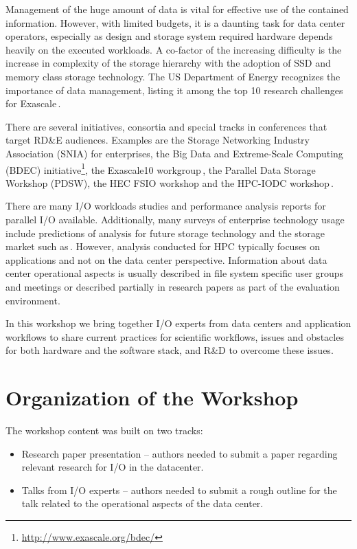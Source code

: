 \documentclass{llncs}
\begin{document}
Management of the huge amount of data is vital for effective use of the contained information. However, with limited budgets, it is a daunting task for data center operators,
especially as design and storage system required hardware depends heavily on the executed workloads.
A co-factor of the increasing difficulty is the increase in complexity of the storage hierarchy with the adoption of SSD and memory class storage technology.
The US Department of Energy recognizes the importance of data management, listing it among the top 10 research challenges for Exascale\,\cite{top14}. %

There are several initiatives, consortia and special tracks in conferences that target RD\&E audiences.
Examples are the Storage Networking Industry Association (SNIA) for enterprises, the 
Big Data and Extreme-Scale Computing (BDEC) initiative\footnote{\url{http://www.exascale.org/bdec/}}, the 
Exascale10 workgroup\,\cite{brinkmann14}, the Parallel Data Storage Workshop (PDSW), the HEC FSIO workshop \cite{bancroft2009} and the HPC-IODC workshop\,\cite{iodc}.

There are many I/O workloads studies and performance analysis reports for parallel I/O available.
Additionally, many surveys of enterprise technology usage include predictions of analysis for future storage technology and the storage market such as\,\cite{idc1}.
However, analysis conducted for HPC typically focuses on applications and not on the data center perspective.
Information about data center operational aspects is usually described in file system specific user groups and meetings or described partially in research papers as part of the evaluation environment.

In this workshop we bring together I/O experts from data centers and application workflows to share current practices for scientific workflows, issues and obstacles for both hardware and the software stack, and R\&D to overcome these issues. 

\section{Organization of the Workshop}

\noindent The workshop content was built on two tracks:
\begin{itemize}
  \item Research paper presentation -- authors needed to submit a paper regarding relevant research for I/O in the datacenter.
  \item Talks from I/O experts -- authors needed to submit a rough outline for the talk related to the operational aspects of the data center.
\end{itemize}        
    
\end{document}
